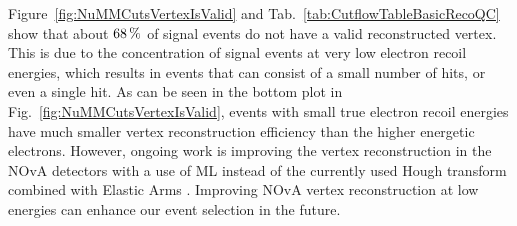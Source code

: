 Figure~\ref{fig:NuMMCutsVertexIsValid} and Tab.~\ref{tab:CutflowTableBasicRecoQC} show that about $\unit[68]{\%}$ of signal events do not have a valid reconstructed vertex. This is due to the concentration of signal events at very low electron recoil energies, which results in events that can consist of a small number of hits, or even a single hit. As can be seen in the bottom plot in Fig.~\ref{fig:NuMMCutsVertexIsValid}, events with small true electron recoil energies have much smaller vertex reconstruction efficiency than the higher energetic electrons. However, ongoing work is improving the vertex reconstruction in the \gls{NOvA} detectors with a use of \gls{ML} instead of the currently used Hough transform combined with Elastic Arms \cite{NOvA-doc-61190}. Improving \gls{NOvA} vertex reconstruction at low energies can enhance our event selection in the future.

